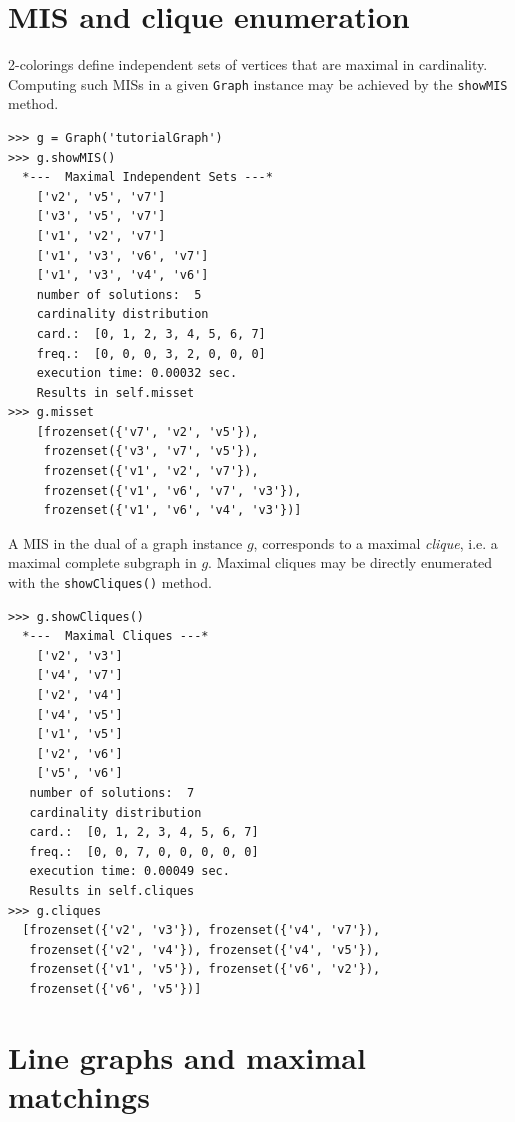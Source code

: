\section{MIS and clique enumeration}
\label{sec:22.3}

2-colorings define independent sets of vertices that are maximal in cardinality. Computing such MISs in a given \texttt{Graph} instance may be achieved by the \texttt{showMIS} method.
\begin{lstlisting}
>>> g = Graph('tutorialGraph')
>>> g.showMIS()
  *---  Maximal Independent Sets ---*
    ['v2', 'v5', 'v7']
    ['v3', 'v5', 'v7']
    ['v1', 'v2', 'v7']
    ['v1', 'v3', 'v6', 'v7']
    ['v1', 'v3', 'v4', 'v6']
    number of solutions:  5
    cardinality distribution
    card.:  [0, 1, 2, 3, 4, 5, 6, 7]
    freq.:  [0, 0, 0, 3, 2, 0, 0, 0]
    execution time: 0.00032 sec.
    Results in self.misset
>>> g.misset
    [frozenset({'v7', 'v2', 'v5'}), 
     frozenset({'v3', 'v7', 'v5'}), 
     frozenset({'v1', 'v2', 'v7'}), 
     frozenset({'v1', 'v6', 'v7', 'v3'}), 
     frozenset({'v1', 'v6', 'v4', 'v3'})]
\end{lstlisting}

A MIS in the dual of a graph instance $g$, corresponds to a maximal \emph{clique}, i.e. a maximal complete subgraph in $g$. Maximal cliques may be directly enumerated with the \texttt{showCliques()} method.
\begin{lstlisting}
>>> g.showCliques()
  *---  Maximal Cliques ---*
    ['v2', 'v3']
    ['v4', 'v7']
    ['v2', 'v4']
    ['v4', 'v5']
    ['v1', 'v5']
    ['v2', 'v6']
    ['v5', 'v6']
   number of solutions:  7
   cardinality distribution
   card.:  [0, 1, 2, 3, 4, 5, 6, 7]
   freq.:  [0, 0, 7, 0, 0, 0, 0, 0]
   execution time: 0.00049 sec.
   Results in self.cliques
>>> g.cliques
  [frozenset({'v2', 'v3'}), frozenset({'v4', 'v7'}), 
   frozenset({'v2', 'v4'}), frozenset({'v4', 'v5'}), 
   frozenset({'v1', 'v5'}), frozenset({'v6', 'v2'}), 
   frozenset({'v6', 'v5'})]
\end{lstlisting}

\section{Line graphs and maximal matchings}
\label{sec:22.4}

